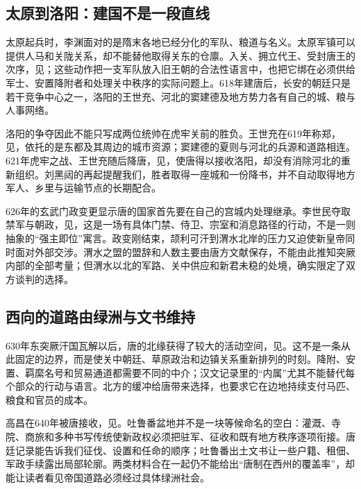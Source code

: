 \subsection{太原到洛阳：建国不是一段直线}
太原起兵时，李渊面对的是隋末各地已经分化的军队、粮道与名义。太原军镇可以提供人马和关陇关系，却不能替他取得关东的仓廪。入关、拥立代王、受封唐王的次序，见；这些动作把一支军队放入旧王朝的合法性语言中，也把它绑在必须供给军士、安置降附者和处理关中秩序的实际问题上。618年建唐后，长安的朝廷只是若干竞争中心之一，洛阳的王世充、河北的窦建德及地方势力各有自己的城、粮与人事网络。

洛阳的争夺因此不能只写成两位统帅在虎牢关前的胜负。王世充在619年称郑，见，依托的是东都及其周边的城市资源；窦建德的夏则与河北的兵源和道路相连。621年虎牢之战、王世充随后降唐，见，使唐得以接收洛阳，却没有消除河北的重新组织。刘黑闼的再起提醒我们，胜者取得一座城和一份降书，并不自动取得地方军人、乡里与运输节点的长期配合。

626年的玄武门政变更显示唐的国家首先要在自己的宫城内处理继承。李世民夺取禁军与朝政，见，这是一场有具体门禁、侍卫、宗室和消息路径的行动，不是一则抽象的“强主即位”寓言。政变刚结束，颉利可汗到渭水北岸的压力又迫使新皇帝同时面对外部交涉。渭水之盟的盟辞和人数主要由唐方文献保存，不能由此推知突厥内部的全部考量；但渭水以北的军路、关中供应和新君未稳的处境，确实限定了双方谈判的选择。

\subsection{西向的道路由绿洲与文书维持}
630年东突厥汗国瓦解以后，唐的北缘获得了较大的活动空间，见。这不是一条从此固定的边界，而是使关中朝廷、草原政治和边镇关系重新排列的时刻。降附、安置、羁縻名号和贸易通道都需要不同的中介；汉文记录里的“内属”尤其不能替代每个部众的行动与语言。北方的缓冲给唐带来选择，也要求它在边地持续支付马匹、粮食和官员的成本。

高昌在640年被唐接收，见。吐鲁番盆地并不是一块等候命名的空白：灌溉、寺院、商旅和多种书写传统使新政权必须把驻军、征收和既有地方秩序逐项衔接。唐廷记录能告诉我们征伐、设置和任命的顺序；吐鲁番出土文书让一些户籍、租佃、军政手续露出局部轮廓。两类材料合在一起仍不能给出“唐制在西州的覆盖率”，却能让读者看见帝国道路必须经过具体绿洲社会。

